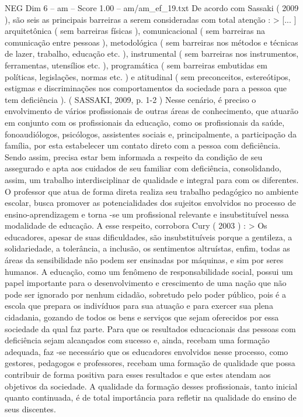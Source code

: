 \begin{textsample}{NEG Dim 6 – am – Score 1.00 – am/am\_ef\_19.txt}
De acordo com Sassaki ( 2009 ), são seis as principais barreiras a serem consideradas com total atenção : > [... ] arquitetônica ( sem barreiras físicas ), comunicacional ( sem barreiras na comunicação entre pessoas ), metodológica ( sem barreiras nos métodos e técnicas de lazer, trabalho, educação etc. ), instrumental ( sem barreiras nos instrumentos, ferramentas, utensílios etc. ), programática ( sem barreiras embutidas em políticas, legislações, normas etc. ) e atitudinal ( sem preconceitos, estereótipos, estigmas e discriminações nos comportamentos da sociedade para a pessoa que tem deficiência ). ( SASSAKI, 2009, p. 1-2 ) Nesse cenário, é preciso o envolvimento de vários profissionais de outras áreas de conhecimento, que atuarão em conjunto com os profissionais da educação, como os profissionais da saúde, fonoaudiólogos, psicólogos, assistentes sociais e, principalmente, a participação da família, por esta estabelecer um contato direto com a pessoa com deficiência.
Sendo assim, precisa estar bem informada a respeito da condição de seu assegurado e apta aos cuidados de seu familiar com deficiência, consolidando, assim, um trabalho interdisciplinar de qualidade e integral para com os diferentes.
O professor que atua de forma direta realiza seu trabalho pedagógico no ambiente escolar, busca promover as potencialidades dos sujeitos envolvidos no processo de ensino-aprendizagem e torna -se um profissional relevante e insubstituível nessa modalidade de educação.
A esse respeito, corrobora Cury ( 2003 ) : > Os educadores, apesar de suas dificuldades, são insubstituíveis porque a gentileza, a solidariedade, a tolerância, a inclusão, os sentimentos altruístas, enfim, todas as áreas da sensibilidade não podem ser ensinadas por máquinas, e sim por seres humanos.
A educação, como um fenômeno de responsabilidade social, possui um papel importante para o desenvolvimento e crescimento de uma nação que não pode ser ignorado por nenhum cidadão, sobretudo pelo poder público, pois é a escola que prepara os indivíduos para sua atuação e para exercer sua plena cidadania, gozando de todos os bens e serviços que sejam oferecidos por essa sociedade da qual faz parte.
Para que os resultados educacionais das pessoas com deficiência sejam alcançados com sucesso e, ainda, recebam uma formação adequada, faz -se necessário que os educadores envolvidos nesse processo, como gestores, pedagogos e professores, recebam uma formação de qualidade que possa contribuir de forma positiva para esses resultados e que estes atendam aos objetivos da sociedade.
A qualidade da formação desses profissionais, tanto inicial quanto continuada, é de total importância para refletir na qualidade do ensino de seus discentes.

\end{textsample}
